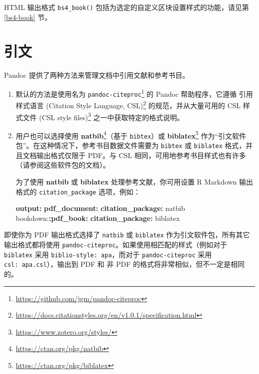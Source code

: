 \documentclass[
  12pt,
]{krantz}
\newenvironment{Shaded}{\begin{snugshade}}{\end{snugshade}}
\newcommand{\AttributeTok}[1]{\textcolor[rgb]{0.13,0.29,0.53}{#1}}
\newcommand{\FunctionTok}[1]{\textcolor[rgb]{0.13,0.29,0.53}{\textbf{#1}}}
\newcommand{\KeywordTok}[1]{\textcolor[rgb]{0.13,0.29,0.53}{\textbf{#1}}}
\renewcommand{\href}[2]{#2\footnote{\url{#1}}}
\theoremstyle{definition}
\theoremstyle{definition}
\theoremstyle{definition}
\theoremstyle{definition}
\theoremstyle{remark}
\begin{document}
HTML 输出格式 \texttt{bs4\_book()} 包括为选定的自定义区块设置样式的功能，请见第 \ref{bs4-book} 节。

\section{引文}\label{citations}

Pandoc 提供了两种方法来管理文档中引用文献和参考书目。

\begin{enumerate}
\def\labelenumi{\arabic{enumi}.}
\item
  默认的方法是使用名为 \href{https://github.com/jgm/pandoc-citeproc}{\texttt{pandoc-citeproc}} 的 Pandoc 帮助程序，它遵循 \href{https://docs.citationstyles.org/en/v1.0.1/specification.html}{引用样式语言 (Citation Style Language, CSL)} 的规范，并从大量可用的 \href{https://www.zotero.org/styles/}{CSL 样式文件 (CSL style files)} 之一中获取特定的格式说明。
\item
  用户也可以选择使用 \href{https://ctan.org/pkg/natbib}{\textbf{natbib}}（基于 \texttt{bibtex}）或 \href{https://ctan.org/pkg/biblatex}{\textbf{biblatex}} 作为``引文软件包''。在这种情况下，参考书目数据文件需要为 \texttt{bibtex} 或 \texttt{biblatex} 格式，并且文档输出格式仅限于 PDF。与 CSL 相同，可用地参考书目样式也有许多（请参阅这些软件包的文档）。

  为了使用 \textbf{natbib} 或 \textbf{biblatex} 处理参考文献，你可用设置 R Markdown 输出格式的 \texttt{citation\_package} 选项，例如：

\begin{Shaded}
\begin{Highlighting}[]
\FunctionTok{output}\KeywordTok{:}
\AttributeTok{  }\FunctionTok{pdf\_document}\KeywordTok{:}
\AttributeTok{    }\FunctionTok{citation\_package}\KeywordTok{:}\AttributeTok{ natbib}
\AttributeTok{  bookdown:}\FunctionTok{:pdf\_book}\KeywordTok{:}
\AttributeTok{    }\FunctionTok{citation\_package}\KeywordTok{:}\AttributeTok{ biblatex}
\end{Highlighting}
\end{Shaded}
\end{enumerate}

即使你为 PDF 输出格式选择了 \texttt{natbib} 或 \texttt{biblatex} 作为引文软件包，所有其它输出格式都将使用 \texttt{pandoc-citeproc}。如果使用相匹配的样式（例如对于 \texttt{biblatex} 采用 \texttt{biblio-style:\ apa}，而对于 \texttt{pandoc-citeproc} 采用 \texttt{csl:\ apa.csl}），输出到 PDF 和 非 PDF 的格式将非常相似，但不一定是相同的。
\end{document}
